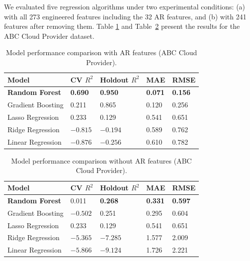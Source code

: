\documentclass[technologies,article,submit,pdftex,moreauthors]{Definitions/mdpi}
\begin{document}
We evaluated five regression algorithms under two experimental
conditions: (a) with all 273 engineered features including the 32 AR
features, and (b) with 241 features after removing them. Table
\ref{tab:model_perf_with} and Table~\ref{tab:model_perf_without}
present the results for the ABC Cloud Provider dataset.

{\def\LTcaptype{none} %
\begin{table}[H]
\centering
\caption{Model performance comparison with AR features (ABC Cloud Provider).\label{tab:model_perf_with}}
\begin{tabular}{@{}lllll@{}}
\toprule
\textbf{Model} & \textbf{CV \(R^2\)} & \textbf{Holdout \(R^2\)} &
\textbf{MAE} & \textbf{RMSE} \\
\midrule
\textbf{Random Forest} & \textbf{0.690} & \textbf{0.950} &
\textbf{0.071} & \textbf{0.156} \\
Gradient Boosting & 0.211 & 0.865 & 0.120 & 0.256 \\
Lasso Regression & 0.233 & 0.129 & 0.541 & 0.651 \\
Ridge Regression & \(-0.815\) & \(-0.194\) & 0.589 & 0.762 \\
Linear Regression & \(-0.876\) & \(-0.256\) & 0.610 & 0.782 \\
\bottomrule
\end{tabular}
\end{table}
}

{\def\LTcaptype{none} %
\begin{table}[H]
\centering
\caption{Model performance comparison without AR features (ABC Cloud Provider).\label{tab:model_perf_without}}
\begin{tabular}{@{}lllll@{}}
\toprule
\textbf{Model} & \textbf{CV \(R^2\)} & \textbf{Holdout \(R^2\)} &
\textbf{MAE} & \textbf{RMSE} \\
\midrule
\textbf{Random Forest} & 0.011 & \textbf{0.268} & \textbf{0.331} &
\textbf{0.597} \\
Gradient Boosting & \(-0.502\) & 0.251 & 0.295 & 0.604 \\
Lasso Regression & 0.233 & 0.129 & 0.541 & 0.651 \\
Ridge Regression & \(-5.365\) & \(-7.285\) & 1.577 & 2.009 \\
Linear Regression & \(-5.866\) & \(-9.124\) & 1.726 & 2.221 \\
\bottomrule
\end{tabular}
\end{table}
}
\end{document}

